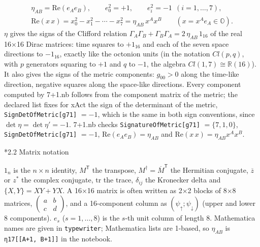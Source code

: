 \documentclass[10pt,a4paper]{article}
\makeatletter
\renewcommand\subsection{\@startsection{subsection}{2}{\z@}{-3.25ex\@plus -1ex \@minus -.2ex}{1.5ex \@plus .2ex}{\normalfont\large\bfseries\raggedright}}
\makeatother
\begin{document}
\begin{gather*}
\eta_{AB}=\mathrm{Re}(e_Ae_B),\qquad e_0^2=+1,\qquad e_i^2=-1\ \ (i=1,\dots,7),\\ \mathrm{Re}(x\,x)=x_0^2-x_1^2-\cdots-x_7^2=\eta_{AB}\,x^Ax^B\qquad (x=x^Ae_A\in\mathbb O).
\end{gather*}
$\eta$ gives the signs of the Clifford relation $\Gamma_A\Gamma_B+\Gamma_B\Gamma_A=2\,\eta_{AB}\,1_{16}$ of the real 16×16 Dirac matrices: time squares to $+1_{16}$ and each of the seven space directions to $-1_{16}$, exactly like the octonion units (in the notation $Cl(p,q)$, with $p$ generators squaring to $+1$ and $q$ to $-1$, the algebra $Cl(1,7)\cong\mathbb R(16)$). It also gives the signs of the metric components: $g_{00}>0$ along the time-like direction, negative squares along the space-like directions. Every component computed by 7+1.nb follows from the component matrix of the metric; the declared list fixes for xAct the sign of the determinant of the metric, \texttt{SignDetOfMetric[g71]} $=-1$, which is the same in both sign conventions, since $\det \eta=\det \eta'=-1$. 7+1.nb checks \texttt{SignatureOfMetric[g71]} $=\{7,1,0\}$, \texttt{SignDetOfMetric[g71]} $=-1$, $\mathrm{Re}(e_Ae_B)=\eta_{AB}$ and $\mathrm{Re}(x\,x)=\eta_{AB}x^Ax^B$.

\subsection*{2.2 Matrix notation}
$1_n$ is the $n\times n$ identity, $M^{\mathsf T}$ the transpose, $M^\dagger=\overline{M}^{\mathsf T}$ the Hermitian conjugate, $\overline{z}$ or $z^*$ the complex conjugate, $\mathrm{tr}$ the trace, $\delta_{ij}$ the Kronecker delta and $\lbrace X,Y\rbrace=XY+YX$. A 16×16 matrix is often written as 2×2 blocks of 8×8 matrices, $\left(\begin{smallmatrix}a&b\\c&d\end{smallmatrix}\right)$, and a 16-component column as $(\psi_\uparrow;\psi_\downarrow)$ (upper and lower 8 components). $e_s$ ($s=1,\dots,8$) is the $s$-th unit column of length 8. Mathematica names are given in \texttt{typewriter}; Mathematica lists are 1-based, so $\eta_{AB}$ is \texttt{η17[[A+1, B+1]]} in the notebook.
\end{document}
